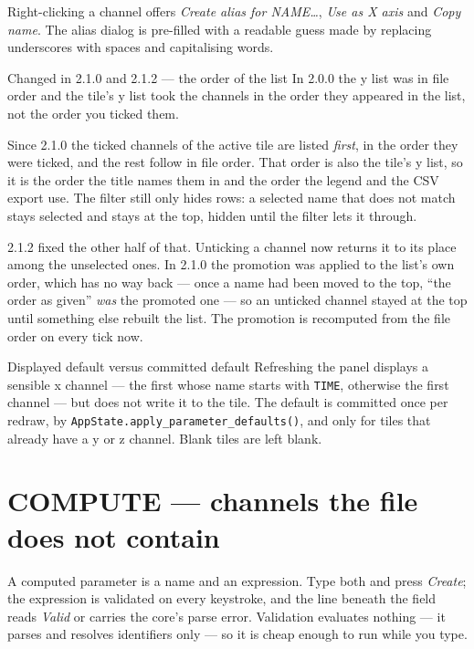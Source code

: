 \documentclass[11pt,a4paper,oneside]{report}
\newcommand{\appver}{2.1.2}
\newcommand{\code}[1]{\texttt{#1}}
\begin{document}
Right-clicking a channel offers \emph{Create alias for NAME\ldots}, \emph{Use as
X axis} and \emph{Copy name}. The alias dialog is pre-filled with a readable
guess made by replacing underscores with spaces and capitalising words.

\begin{aoenew}{Changed in 2.1.0 and \appver{} --- the order of the list}
In 2.0.0 the y list was in file order and the tile's y list took the channels in
the order they appeared in the list, not the order you ticked them.

Since 2.1.0 the ticked channels of the active tile are listed \emph{first}, in
the order they were ticked, and the rest follow in file order. That order is
also the tile's y list, so it is the order the title names them in and the order
the legend and the CSV export use. The filter still only hides rows: a selected
name that does not match stays selected and stays at the top, hidden until the
filter lets it through.

\appver{} fixed the other half of that. Unticking a channel now returns it to its
place among the unselected ones. In 2.1.0 the promotion was applied to the
list's own order, which has no way back --- once a name had been moved to the
top, ``the order as given'' \emph{was} the promoted one --- so an unticked
channel stayed at the top until something else rebuilt the list. The promotion
is recomputed from the file order on every tick now.
\end{aoenew}

\begin{aoenote}{Displayed default versus committed default}
Refreshing the panel displays a sensible x channel --- the first whose name
starts with \code{TIME}, otherwise the first channel --- but does not write it to
the tile. The default is committed once per redraw, by
\code{AppState.apply\_parameter\_defaults()}, and only for tiles that already
have a y or z channel. Blank tiles are left blank.
\end{aoenote}

\section{COMPUTE --- channels the file does not contain}

A computed parameter is a name and an expression. Type both and press
\emph{Create}; the expression is validated on every keystroke, and the line
beneath the field reads \emph{Valid} or carries the core's parse error.
Validation evaluates nothing --- it parses and resolves identifiers only --- so
it is cheap enough to run while you type.
\end{document}
